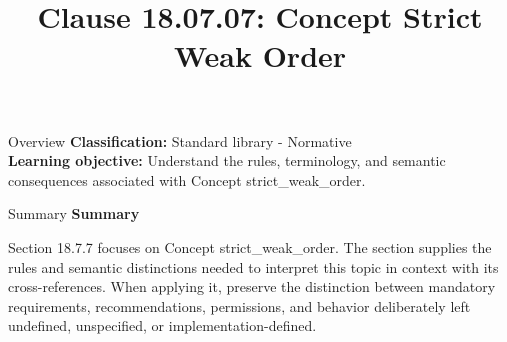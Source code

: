 \documentclass[10pt,letterpaper]{article}
\title{Clause 18.07.07: Concept Strict Weak Order}
\author{}
\date{}
\begin{document}
\maketitle
\begin{CornellOverviewBox}{Overview}
\textbf{Classification:} Standard library - Normative\\[2pt]
\textbf{Learning objective:} Understand the rules, terminology, and semantic consequences associated with Concept strict\_weak\_order.
\end{CornellOverviewBox}\begin{CornellSummaryBox}{Summary}
{\sffamily\bfseries\color{Accent} Summary}\par\vspace{3pt}Section 18.7.7 focuses on Concept strict\_weak\_order. The section supplies the rules and semantic distinctions needed to interpret this topic in context with its cross-references. When applying it, preserve the distinction between mandatory requirements, recommendations, permissions, and behavior deliberately left undefined, unspecified, or implementation-defined.
\end{CornellSummaryBox}
\end{document}
